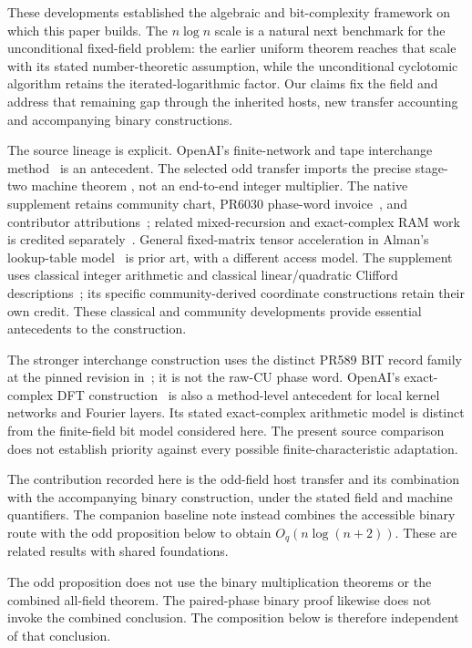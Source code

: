 \documentclass[11pt]{article}
\theoremstyle{definition}
\begin{document}
These developments established the algebraic and bit-complexity
framework on which this paper builds. The $n\log n$ scale is a
natural next benchmark for the unconditional fixed-field problem:
the earlier uniform theorem reaches that scale with its stated
number-theoretic assumption, while the unconditional cyclotomic
algorithm retains the iterated-logarithmic factor. Our claims fix
the field and address that remaining gap through the inherited hosts,
new transfer accounting and accompanying binary constructions.

The source lineage is explicit. OpenAI's finite-network and tape
interchange method~\cite{OpenAI26} is an antecedent. The selected odd
transfer imports the precise stage-two machine theorem
\cite{Stage2Machine26}, not an end-to-end integer multiplier.
The native supplement retains community chart, PR6030 phase-word
invoice~\cite{CommunityPhase26}, and contributor
attributions~\cite{Community26}; related mixed-recursion and
exact-complex RAM work is credited separately~\cite{Sussman26}.
General fixed-matrix tensor acceleration in Alman's lookup-table
model~\cite{Alman23} is prior art, with a different access model.
The supplement uses classical integer arithmetic
\cite{SS71,BrentZimmermann10} and classical linear/quadratic
Clifford descriptions~\cite{DehaeneDeMoor03}; its specific
community-derived coordinate constructions retain their own credit.
These classical and community developments provide essential
antecedents to the construction.

The stronger interchange construction uses the distinct PR589 BIT record
family at the pinned revision in~\cite{CommunityBIT26}; it is not the
raw-CU phase word. OpenAI's exact-complex DFT construction~\cite{ExactDFT26}
is also a method-level antecedent for local kernel networks and Fourier
layers. Its stated exact-complex arithmetic model is distinct from the
finite-field bit model considered here. The present source comparison
does not establish priority against every possible finite-characteristic
adaptation.

The contribution recorded here is the odd-field host transfer and
its combination with the accompanying binary construction, under the
stated field and machine quantifiers. The companion baseline note
\cite{GeneralBaseline} instead combines the accessible binary route
with the odd proposition below to obtain $O_q(n\log(n+2))$.
These are related results with shared foundations.

The odd proposition does not use the binary multiplication theorems or
the combined all-field theorem. The paired-phase binary proof likewise
does not invoke the combined conclusion. The composition below is
therefore independent of that conclusion.
\end{document}
